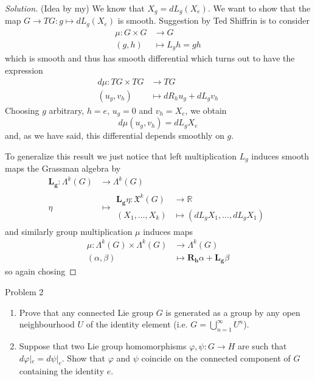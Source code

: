\begin{proof}[Solution]\leavevmode
	(Idea by my) We know that $X_g=dL_g(X_e)$. We want to show that the map $G \to TG:g\mapsto dL_g(X_e)$ is smooth. Suggestion by Ted Shiffrin is to consider 
	\begin{align*}
		\mu: G\times G &\longrightarrow G \\
		(g,h) &\longmapsto L_gh=gh
	\end{align*}
	which is smooth and thus has smooth differential which turns out to have the expression
	\begin{align*}
		d\mu: TG\times TG &\longrightarrow TG \\
		(u_g,v_h) &\longmapsto dR_hu_g+dL_g v_h
	\end{align*}
	Choosing $g$ arbitrary, $h=e$, $u_g=0$ and $v_h=X_e$, we obtain
	\[d\mu(u_g,v_h)=dL_gX_e\]
	and, as we have said, this differential depends smoothly on $g$.

	To generalize this result we just notice that left multiplication $L_g$ induces smooth maps the Grassman algebra by
	\begin{align*}
		\mathbf{L_g}: \Lambda^{k}(G) &\longrightarrow \Lambda^{k}(G) \\
		\eta &\longmapsto \begin{aligned}
			\mathbf{L_g}\eta: \mathfrak{X}^k(G) &\longrightarrow \mathbb{R} \\
			(X_1,\ldots,X_k) &\longmapsto (dL_gX_1,\ldots,dL_gX_1)
		\end{aligned}
	\end{align*}
and similarly group multiplication $\mu$ induces maps
\begin{align*}
	\mu: \Lambda^{k}(G) \times \Lambda^{k}(G)&\longrightarrow \Lambda^{k}(G) \\
	(\alpha,\beta) &\longmapsto \mathbf{R_h}\alpha+\mathbf{L_g}\beta
\end{align*}
so again chosing 
	
\end{proof}

\begin{idea4}{Problem 2}\leavevmode
	\begin{enumerate}[label=\alph*.]
		\item Prove that any connected Lie group $G$ is generated as a group by any open neighbourhood $U$ of the identity element (i.e. $G=\bigcup_{n=1}^\infty U^n$).
		\item Suppose that two Lie group homomorphisms $\varphi,\psi:G\to H$ are such that $d\varphi|_{e}=d\psi|_{e}$. Show that $\varphi$ and $\psi$ coincide on the connected component of $G$ containing the identity $e$.
	\end{enumerate}
\end{idea4}

